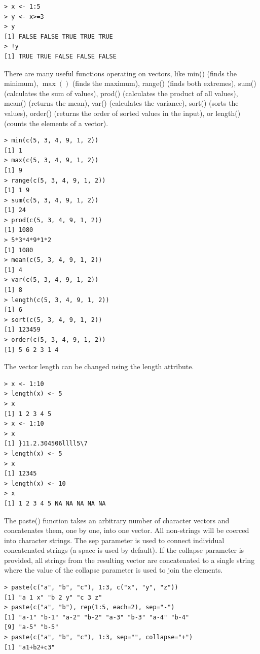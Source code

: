 \documentclass[10pt]{book}
\begin{document}
\begin{verbatim}
> x <- 1:5
> y <- x>=3
> y
[1] FALSE FALSE TRUE TRUE TRUE
> !y
[1] TRUE TRUE FALSE FALSE FALSE
\end{verbatim}

There are many useful functions operating on vectors, like min() (finds the minimum), $\max ()$ (finds the maximum), range() (finds both extremes), sum() (calculates the sum of values), prod() (calculates the product of all values), mean() (returns the mean), var() (calculates the variance), sort() (sorts the values), order() (returns the order of sorted values in the input), or length() (counts the elements of a vector).

\begin{verbatim}
> min(c(5, 3, 4, 9, 1, 2))
[1] 1
> max(c(5, 3, 4, 9, 1, 2))
[1] 9
> range(c(5, 3, 4, 9, 1, 2))
[1] 1 9
> sum(c(5, 3, 4, 9, 1, 2))
[1] 24
> prod(c(5, 3, 4, 9, 1, 2))
[1] 1080
> 5*3*4*9*1*2
[1] 1080
> mean(c(5, 3, 4, 9, 1, 2))
[1] 4
> var(c(5, 3, 4, 9, 1, 2))
[1] 8
> length(c(5, 3, 4, 9, 1, 2))
[1] 6
> sort(c(5, 3, 4, 9, 1, 2))
[1] 123459
> order(c(5, 3, 4, 9, 1, 2))
[1] 5 6 2 3 1 4
\end{verbatim}

The vector length can be changed using the length attribute.

\begin{verbatim}
> x <- 1:10
> length(x) <- 5
> x
[1] 1 2 3 4 5
> x <- 1:10
> x
[1] }11.2.304506llll5\7
> length(x) <- 5
> x
[1] 12345
> length(x) <- 10
> x
[1] 1 2 3 4 5 NA NA NA NA NA
\end{verbatim}

The paste() function takes an arbitrary number of character vectors and concatenates them, one by one, into one vector. All non-strings will be coerced\\
into character strings. The sep parameter is used to connect individual concatenated strings (a space is used by default). If the collapse parameter is provided, all strings from the resulting vector are concatenated to a single string where the value of the collapse parameter is used to join the elements.

\begin{verbatim}
> paste(c("a", "b", "c"), 1:3, c("x", "y", "z"))
[1] "a 1 x" "b 2 y" "c 3 z"
> paste(c("a", "b"), rep(1:5, each=2), sep="-")
[1] "a-1" "b-1" "a-2" "b-2" "a-3" "b-3" "a-4" "b-4"
[9] "a-5" "b-5"
> paste(c("a", "b", "c"), 1:3, sep="", collapse="+")
[1] "a1+b2+c3"
\end{verbatim}
\end{document}

